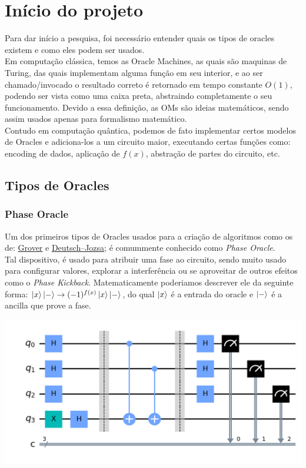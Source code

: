 \documentclass{article}
\begin{document}
\section{Início do projeto}
Para dar início a pesquisa, foi necessário entender quais os tipos de oracles existem e como eles podem ser usados.\\
Em computação clássica, temos as Oracle Machines, as quais são maquinas de Turing, das quais implementam alguma função em seu interior, e ao ser chamado/invocado o resultado correto é retornado em tempo constante $O(1)$, podendo ser vista como uma caixa preta, abstraindo completamente o seu funcionamento. Devido a essa definição, as OMs são ideias matemáticos, sendo assim usados apenas para formalismo matemático.\\
Contudo em computação quântica, podemos de fato implementar certos modelos de Oracles e adiciona-los a um circuito maior, executando certas funções como: encoding de dados, aplicação de $f(x)$, abstração de partes do circuito, etc.

\subsection{Tipos de Oracles}

\subsubsection{Phase Oracle}
Um dos primeiros tipos de Oracles usados para a criação de algoritmos como os de: \href{https://en.wikipedia.org/wiki/Grover%27s_algorithm}{Grover} e \href{https://en.wikipedia.org/wiki/Deutsch%E2%80%93Jozsa_algorithm}{Deutsch–Jozsa}; é comummente conhecido como \emph{Phase Oracle}.\\
Tal dispositivo, é usado para atribuir uma fase ao circuito, sendo muito usado para configurar valores, explorar a interferência ou se aproveitar de outros efeitos como o \textit{Phase Kickback}. Matematicamente poderiamos descrever ele da seguinte forma: $\mathinner{|{x}\rangle}\mathinner{|{-}\rangle} \to (-1)^{f(x)}\mathinner{|{x}\rangle}\mathinner{|{-}\rangle}$, do qual $\mathinner{|{x}\rangle}$ é a entrada do oracle e $\mathinner{|{-}\rangle}$ é a ancilla que prove a fase.

\begin{center}
	\includegraphics[scale=0.3]{phase_oracle_1.png}
	\label{fig:phase-oracle-1}
\end{center}
\end{document}
